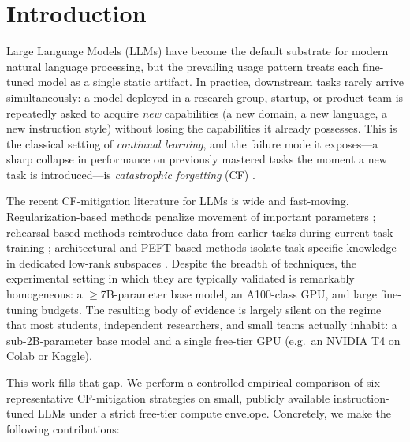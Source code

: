 \section{Introduction}
\label{sec:introduction}

Large Language Models (LLMs) have become the default substrate for
modern natural language processing, but the prevailing usage pattern
treats each fine-tuned model as a single static artifact. In
practice, downstream tasks rarely arrive simultaneously: a model
deployed in a research group, startup, or product team is repeatedly
asked to acquire \emph{new} capabilities (a new domain, a new
language, a new instruction style) without losing the capabilities it
already possesses. This is the classical setting of
\emph{continual learning}, and the failure mode it exposes---a sharp
collapse in performance on previously mastered tasks the moment a new
task is introduced---is \emph{catastrophic forgetting} (CF)
\cite{mccloskey1989catastrophic,luo2023empirical}.

The recent CF-mitigation literature for LLMs is wide and
fast-moving. Regularization-based methods penalize movement of
important parameters \cite{kirkpatrick2017overcoming,li2024revisiting,song2025hierarchical};
rehearsal-based methods reintroduce data
from earlier tasks during current-task training \cite{huang2024ssr,reynolds2025mixed};
architectural and PEFT-based methods isolate
task-specific knowledge in dedicated low-rank subspaces
\cite{hu2021lora,wang2023olora,fawi2024curlora,nayak2025sculpting}.
Despite the breadth of techniques, the experimental setting in which
they are typically validated is remarkably homogeneous: a
$\geq$7B-parameter base model, an A100-class GPU, and large
fine-tuning budgets. The resulting body of evidence is largely
silent on the regime that most students, independent researchers,
and small teams actually inhabit: a sub-2B-parameter base model and a
single free-tier GPU (e.g.\ an NVIDIA T4 on Colab or Kaggle).

This work fills that gap. We perform a controlled empirical
comparison of six representative CF-mitigation strategies on small,
publicly available instruction-tuned LLMs under a strict
free-tier compute envelope. Concretely, we make the following
contributions:

